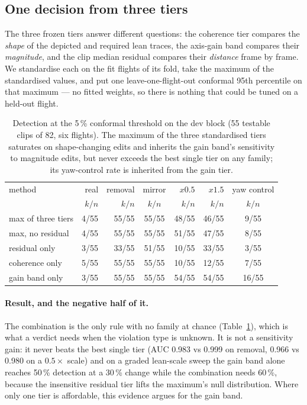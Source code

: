 
\subsection{One decision from three tiers}
\label{sec:g02-combined}

The three frozen tiers answer different questions: the coherence tier compares the \emph{shape}
of the depicted and required lean traces, the axis-gain band compares their \emph{magnitude},
and the clip median residual compares their \emph{distance} frame by frame. We standardise each
on the fit flights of its fold, take the maximum of the standardised values, and put one
leave-one-flight-out conformal 95th percentile on that maximum --- no fitted weights, so there
is nothing that could be tuned on a held-out flight.

\begin{table}[t]
\centering
\caption{Detection at the 5\,\% conformal threshold on the dev block (55 testable clips of 82,
six flights). The maximum of the three standardised tiers saturates on shape-changing edits and
inherits the gain band's sensitivity to magnitude edits, but never exceeds the best single tier
on any family; its yaw-control rate is inherited from the gain tier.}
\label{tab:g02-detection}
\begin{tabular}{lrrcrrc}
\toprule
method & real & removal & mirror & $x0.5$ & $x1.5$ & yaw control \\
 & $k/n$ & $k/n$ & $k/n$ & $k/n$ & $k/n$ & $k/n$ \\
\midrule
max of three tiers & 4/55 & 55/55 & 55/55 & 48/55 & 46/55 & 9/55 \\
max, no residual   & 4/55 & 55/55 & 55/55 & 51/55 & 47/55 & 8/55 \\
residual only      & 3/55 & 33/55 & 51/55 & 10/55 & 33/55 & 3/55 \\
coherence only     & 5/55 & 55/55 & 55/55 & 10/55 & 12/55 & 7/55 \\
gain band only     & 3/55 & 55/55 & 55/55 & 54/55 & 54/55 & 16/55 \\
\bottomrule
\end{tabular}
\end{table}

\paragraph{Result, and the negative half of it.} The combination is the only rule with no family
at chance (Table~\ref{tab:g02-detection}), which is what a verdict needs when the violation type
is unknown. It is not a sensitivity gain: it never beats the best single tier (AUC 0.983 vs
0.999 on removal, 0.966 vs 0.980 on a $0.5\times$ scale) and on a graded lean-scale sweep the
gain band alone reaches 50\,\% detection at a 30\,\% change while the combination needs 60\,\%,
because the insensitive residual tier lifts the maximum's null distribution. Where only one tier
is affordable, this evidence argues for the gain band.


